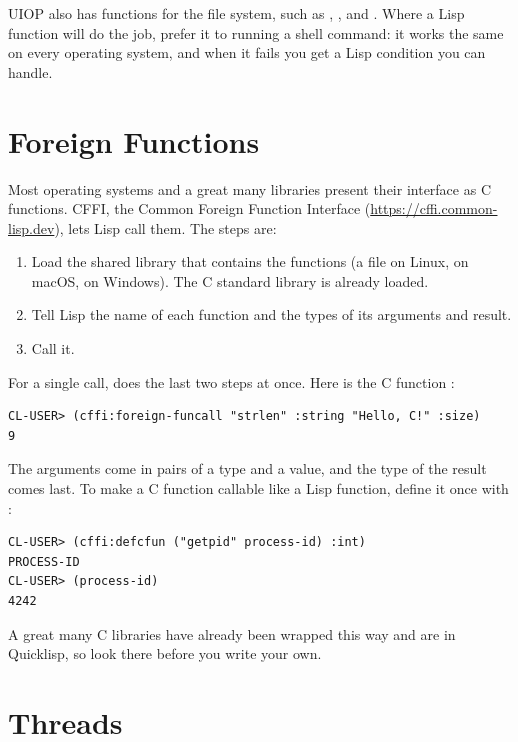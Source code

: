 UIOP also has functions for the file system, such as
, , 
and . Where a Lisp function will do the job,
prefer it to running a shell command: it works the same on every
operating system, and when it fails you get a Lisp condition you can
handle.

\section{Foreign Functions}

Most operating systems and a great many libraries present their
interface as C functions. CFFI, the Common Foreign Function
Interface (\url{https://cffi.common-lisp.dev}), lets Lisp call
them. The steps are:

\begin{enumerate}
\item Load the shared library that contains the functions (a
 file on Linux,  on macOS,  on
Windows). The C standard library is already loaded.

\item Tell Lisp the name of each function and the types of its
arguments and result.

\item Call it.
\end{enumerate}

For a single call,  does the last two steps at
once. Here is the C function :

\begin{verbatim}
CL-USER> (cffi:foreign-funcall "strlen" :string "Hello, C!" :size)
9
\end{verbatim}

The arguments come in pairs of a type and a value, and the type of
the result comes last. To make a C function callable like a Lisp
function, define it once with :

\begin{verbatim}
CL-USER> (cffi:defcfun ("getpid" process-id) :int)
PROCESS-ID
CL-USER> (process-id)
4242
\end{verbatim}

A great many C libraries have already been wrapped this way and are
in Quicklisp, so look there before you write your own.

\section{Threads}

